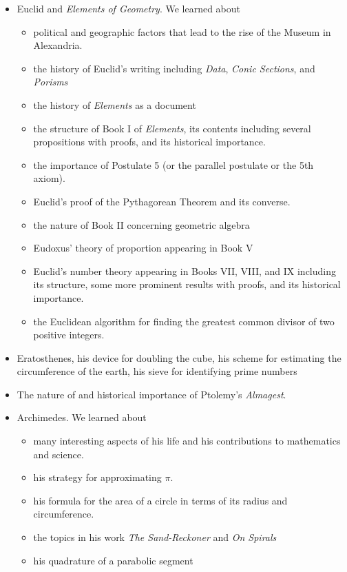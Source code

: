 \documentclass[11pt,fleqn]{article}
\begin{document}
\begin{itemize}
\item Euclid and \textit{Elements of Geometry}. We learned about
	\begin{itemize}
	\item political and geographic factors that lead to the rise of the Museum in Alexandria.
	\item the history of Euclid's writing including \textit{Data}, \textit{Conic Sections}, and \textit{Porisms}
	\item the history of \textit{Elements} as a document
	\item the structure of Book I of \textit{Elements}, its contents including several propositions with proofs, and its historical importance.
	\item the importance of Postulate 5 (or the parallel postulate or the 5th axiom).
	\item Euclid's proof of the Pythagorean Theorem and its converse.
	\item the nature of Book II concerning geometric algebra
	\item Eudoxus' theory of proportion appearing in Book V
	\item Euclid's number theory appearing in Books VII, VIII, and IX including its structure, some more prominent results with proofs, and its historical importance.
	\item the Euclidean algorithm for finding the greatest common divisor of two positive integers.
	\end{itemize}
\item Eratosthenes, his device for doubling the cube, his scheme for estimating the circumference of the earth, his sieve for identifying prime numbers
\item The nature of and historical importance of Ptolemy's \textit{Almagest}.
\item Archimedes. We learned about
	\begin{itemize}
	\item many interesting aspects of his life and his contributions to mathematics and science.
	\item his strategy for approximating $\pi$.
	\item his formula for the area of a circle in terms of its radius and circumference.
	\item the topics in his work \textit{The Sand-Reckoner} and \textit{On Spirals}
	\item his quadrature of a parabolic segment
	\end{itemize}
\end{itemize}
\end{document}
